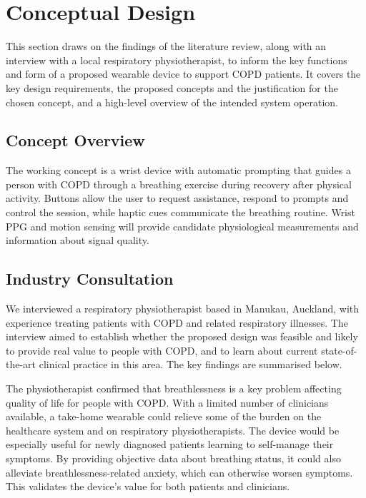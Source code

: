 \section{Conceptual Design}
\label{sec:conceptual-design}

This section draws on the findings of the literature review, along with an interview with a local respiratory physiotherapist, to inform the key functions and form of a proposed wearable device to support COPD patients. It covers the key design requirements, the proposed concepts and the justification for the chosen concept, and a high-level overview of the intended system operation.

\subsection{Concept Overview}
The working concept is a wrist device with automatic prompting that guides a person with COPD through a breathing exercise during recovery after physical activity. Buttons allow the user to request assistance, respond to prompts and control the session, while haptic cues communicate the breathing routine. Wrist PPG and motion sensing will provide candidate physiological measurements and information about signal quality.

\subsection{Industry Consultation}
We interviewed a respiratory physiotherapist based in Manukau, Auckland, with experience treating patients with COPD and related respiratory illnesses. The interview aimed to establish whether the proposed design was feasible and likely to provide real value to people with COPD, and to learn about current state-of-the-art clinical practice in this area. The key findings are summarised below.

The physiotherapist confirmed that breathlessness is a key problem affecting quality of life for people with COPD. With a limited number of clinicians available, a take-home wearable could relieve some of the burden on the healthcare system and on respiratory physiotherapists. The device would be especially useful for newly diagnosed patients learning to self-manage their symptoms. By providing objective data about breathing status, it could also alleviate breathlessness-related anxiety, which can otherwise worsen symptoms. This validates the device's value for both patients and clinicians.

